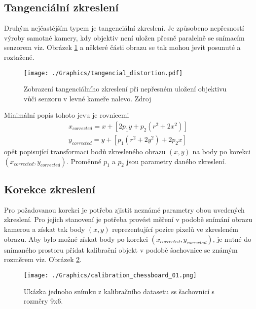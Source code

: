 \documentclass[czech, bc, kky, he, iso690numb]{fasthesis}
\begin{document}
        	\subsection{Tangenciální zkreslení}
	        	Druhým nejčastějším typem je tangenciální zkreslení. Je způsobeno nepřesností výroby samotné kamery, kdy objektiv není uložen přesně paralelně se snímacím senzorem viz. Obrázek \ref{pic:tangencial_distortion} a některé části obrazu se tak mohou jevit posunuté a roztažené.
	        		\begin{figure}[h]
	        			\centering
	        			\texttt{[image: ./Graphics/tangencial\_distortion.pdf]}
	        			\caption{Zobrazení tangenciálního zkreslení při nepřesném uložení objektivu vůči senzoru v levné kameře nalevo. Zdroj \cite[p.~377]{learning_opencv} }
	        			\label{pic:tangencial_distortion}
	        		\end{figure}
	        	Minimální popis tohoto jevu je rovnicemi
	        		\begin{eqnarray}
	        			x_{corrected} = x + [2p_{1}y + p_{2}(r^{2} + 2x^{2})]\\
	        			y_{corrected} = y + [p_{1}(r^{2} + 2y^{2}) + 2p_{2}x]
	        		\end{eqnarray}
	        	opět popisující transformaci bodů zkresleného obrazu \((x, y)\) na body po korekci \((x_{corrected}, y_{corrected})\). Proměnné \(p_{1}\) a \(p_{2}\) jsou parametry daného zkreslení.
	        \subsection{Korekce zkreslení}
	        	Pro požadovanou korekci je potřeba zjistit neznámé parametry obou uvedených zkreslení. Pro jejich stanovení je potřeba provést měření v podobě snímání obrazu kamerou a získat tak body \((x,y)\) reprezentující pozice pixelů ve zkresleném obrazu. Aby bylo možné získat body po korekci \((x_{corrected}, y_{corrected})\), je nutné do snímaného prostoru přidat kalibrační objekt v podobě šachovnice se známým rozměrem viz. Obrázek \ref{pic:calibration_chessboard_01}. 
	        		\begin{figure}[h]
	        			\centering
	        			\texttt{[image: ./Graphics/calibration\_chessboard\_01.png]}
	        			\caption{Ukázka jednoho snímku z kalibračního datasetu ss šachovnicí s rozměry 9x6.}
	        			\label{pic:calibration_chessboard_01}
	        		\end{figure}
	        	
\end{document}
